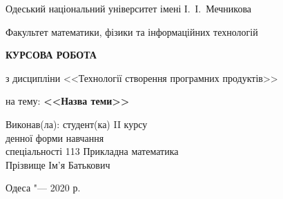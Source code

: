 \thispagestyle{empty}

\begin{center}
Одеський національний університет імені І.~І.~Мечникова

Факультет математики, фізики та інформаційних технологій
\end{center}

\vfill

\begin{center}
\large
\textbf{КУРСОВА РОБОТА}

з дисципліни <<Технології створення програмних продуктів>>

\bigskip

на тему: \textbf{<<Назва теми>>}
\end{center}

\vspace{2cm}

\hfill
\begin{minipage}{0.6\textwidth}
Виконав(ла): студент(ка) II курсу\\
денної форми навчання\\
спеціальності 113 Прикладна математика\\
Прізвище Ім'я Батькович
\end{minipage}

\vfill

\begin{center}
Одеса "--- 2020 р.
\end{center}